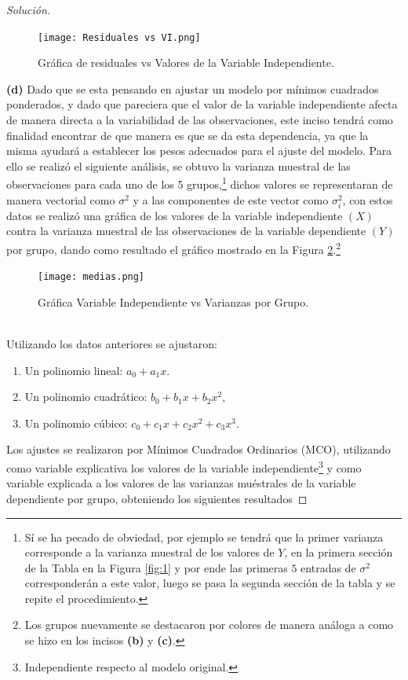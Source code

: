 \documentclass[10.5pt,notitlepage]{article}
\newenvironment{solucion}
  {\begin{proof}[Solución]}
  {\end{proof}}
\theoremstyle{plain}
\begin{document}
\begin{solucion}
\begin{figure}[htb]
 \centering
 \texttt{[image: Residuales vs VI.png]}
 \caption{Gráfica de residuales vs Valores de la Variable Independiente.}
 \label{fig:5}
\end{figure}

\noindent \textbf{(d)} Dado que se esta pensando en ajustar un modelo por mínimos cuadrados ponderados, y dado que pareciera que el valor de la variable independiente afecta de manera directa a la variabilidad de las observaciones, este inciso tendrá como finalidad encontrar de que manera es que se da esta dependencia, ya que la misma ayudará a establecer los pesos adecuados para el ajuste del modelo. Para ello se realizó el siguiente análisis, se obtuvo la varianza muestral de las observaciones para cada uno de los 5 grupos,\footnote{Sí se ha pecado de obviedad, por ejemplo se tendrá que la primer varianza corresponde a la varianza muestral de los valores de \(Y\), en la primera sección de la Tabla en la Figura \ref{fig:1} y por ende las primeras \(5\) entradas de \(\sigma^2\) corresponderán a este valor, luego se pasa la segunda sección de la tabla y se repite el procedimiento.} dichos valores se representaran de manera vectorial como \(\sigma^2\) y a las componentes de este vector como \(\sigma_i^2\), con estos datos se realizó una gráfica de los valores de la variable independiente \((X)\) contra la varianza muestral de las observaciones de la variable dependiente \((Y)\) por grupo, dando como resultado el gráfico mostrado en la Figura \ref{fig:6}.\footnote{Los grupos nuevamente se destacaron por colores de manera análoga a como se hizo en los incisos \textbf{(b)} y \textbf{(c)}.}
\begin{figure}[htb]
 \centering
 \texttt{[image: medias.png]}
 \caption{Gráfica Variable Independiente vs Varianzas por Grupo.}
 \label{fig:6}
\end{figure}\\
Utilizando los datos anteriores se ajustaron:
\begin{enumerate}
    \item Un polinomio lineal: \(a_0 + a_1 x\).
    \item Un polinomio cuadrático: \(b_0 + b_1 x + b_2 x^2\), 
    \item Un polinomio cúbico: \(c_0 + c_1 x + c_2 x^2 + c_3 x^3\).
\end{enumerate}
Los ajustes se realizaron por Mínimos Cuadrados Ordinarios (MCO), utilizando como variable explicativa los valores de la variable independiente\footnote{Independiente respecto al modelo original.} y como variable explicada a los valores de las varianzas muéstrales de la variable dependiente por grupo, obteniendo los siguientes resultados

\end{solucion}
\end{document}
